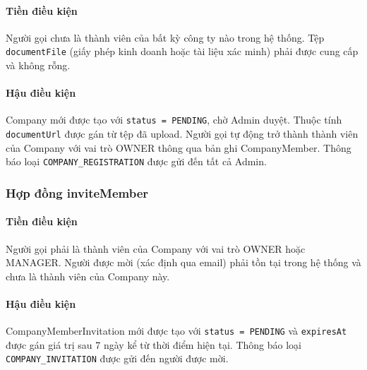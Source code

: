 \paragraph{Tiền điều kiện}
Người gọi chưa là thành viên của bất kỳ công ty nào trong hệ thống. Tệp \texttt{documentFile} (giấy phép kinh doanh hoặc tài liệu xác minh) phải được cung cấp và không rỗng.

\paragraph{Hậu điều kiện}
Company mới được tạo với \texttt{status = PENDING}, chờ Admin duyệt. Thuộc tính \texttt{documentUrl} được gán từ tệp đã upload. Người gọi tự động trở thành thành viên của Company với vai trò OWNER thông qua bản ghi CompanyMember. Thông báo loại \texttt{COMPANY\_REGISTRATION} được gửi đến tất cả Admin.

\subsubsection{Hợp đồng inviteMember}

\paragraph{Tiền điều kiện}
Người gọi phải là thành viên của Company với vai trò OWNER hoặc MANAGER. Người được mời (xác định qua email) phải tồn tại trong hệ thống và chưa là thành viên của Company này.

\paragraph{Hậu điều kiện}
CompanyMemberInvitation mới được tạo với \texttt{status = PENDING} và \texttt{expiresAt} được gán giá trị sau 7 ngày kể từ thời điểm hiện tại. Thông báo loại \texttt{COMPANY\_INVITATION} được gửi đến người được mời.
